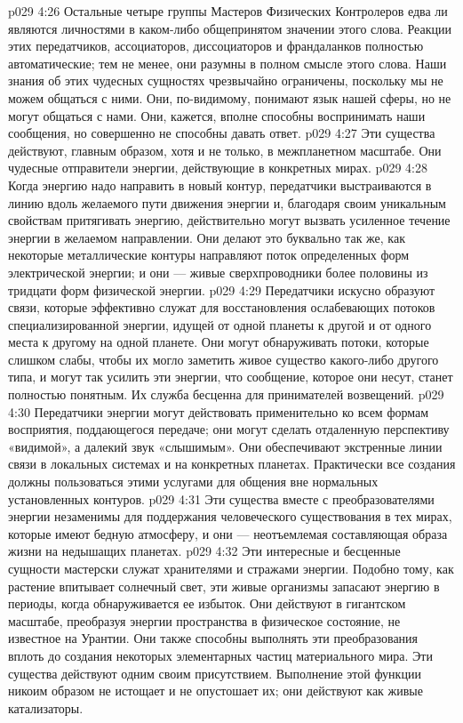 \vs p029 4:26 \pc Остальные четыре группы Мастеров Физических Контролеров едва ли являются личностями в каком\hyp{}либо общепринятом значении этого слова. Реакции этих передатчиков, ассоциаторов, диссоциаторов и франдаланков полностью автоматические; тем не менее, они разумны в полном смысле этого слова. Наши знания об этих чудесных сущностях чрезвычайно ограничены, поскольку мы не можем общаться с ними. Они, по\hyp{}видимому, понимают язык нашей сферы, но не могут общаться с нами. Они, кажется, вполне способны воспринимать наши сообщения, но совершенно не способны давать ответ.
\vs p029 4:27 \pc {}\bibnobreakspace {} Эти существа действуют, главным образом, хотя и не только, в межпланетном масштабе. Они чудесные отправители энергии, действующие в конкретных мирах.
\vs p029 4:28 Когда энергию надо направить в новый контур, передатчики выстраиваются в линию вдоль желаемого пути движения энергии и, благодаря своим уникальным свойствам притягивать энергию, действительно могут вызвать усиленное течение энергии в желаемом направлении. Они делают это буквально так же, как некоторые металлические контуры направляют поток определенных форм электрической энергии; и они --- живые сверхпроводники более половины из тридцати форм физической энергии.
\vs p029 4:29 Передатчики искусно образуют связи, которые эффективно служат для восстановления ослабевающих потоков специализированной энергии, идущей от одной планеты к другой и от одного места к другому на одной планете. Они могут обнаруживать потоки, которые слишком слабы, чтобы их могло заметить живое существо какого\hyp{}либо другого типа, и могут так усилить эти энергии, что сообщение, которое они несут, станет полностью понятным. Их служба бесценна для принимателей возвещений.
\vs p029 4:30 Передатчики энергии могут действовать применительно ко всем формам восприятия, поддающегося передаче; они могут сделать отдаленную перспективу «видимой», а далекий звук «слышимым». Они обеспечивают экстренные линии связи в локальных системах и на конкретных планетах. Практически все создания должны пользоваться этими услугами для общения вне нормальных установленных контуров.
\vs p029 4:31 Эти существа вместе с преобразователями энергии незаменимы для поддержания человеческого существования в тех мирах, которые имеют бедную атмосферу, и они --- неотъемлемая составляющая образа жизни на недышащих планетах.
\vs p029 4:32 \pc {}\bibnobreakspace {} Эти интересные и бесценные сущности мастерски служат хранителями и стражами энергии. Подобно тому, как растение впитывает солнечный свет, эти живые организмы запасают энергию в периоды, когда обнаруживается ее избыток. Они действуют в гигантском масштабе, преобразуя энергии пространства в физическое состояние, не известное на Урантии. Они также способны выполнять эти преобразования вплоть до создания некоторых элементарных частиц материального мира. Эти существа действуют одним своим присутствием. Выполнение этой функции никоим образом не истощает и не опустошает их; они действуют как живые катализаторы.
